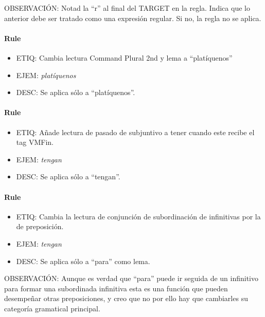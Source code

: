\documentclass[11pt]{report}
\begin{document}
OBSERVACIÓN: Notad la ``r'' al final del TARGET en la regla. Indica que lo anterior debe ser tratado como una expresión regular. Si no, la regla no se aplica.

\paragraph*{Rule}
\begin{itemize}
\item ETIQ: Cambia lectura Command Plural 2nd y lema a ``platíquenos'' 
\item EJEM: \emph{platíquenos} 
\item DESC: Se aplica sólo a ``platíquenos''.
\end{itemize}

\paragraph*{Rule}
\begin{itemize}
\item ETIQ: Añade lectura de pasado de subjuntivo a tener cuando este recibe el tag VMFin. 
\item EJEM: \emph{tengan} 
\item DESC: Se aplica sólo a ``tengan''.
\end{itemize}

\paragraph*{Rule}
\begin{itemize}
\item ETIQ: Cambia la lectura de conjunción de subordinación de infinitivas por la de preposición. 
\item EJEM: \emph{tengan} 
\item DESC: Se aplica sólo a ``para'' como lema.
\end{itemize}

OBSERVACIÓN: Aunque es verdad que ``para'' puede ir seguida de un infinitivo para formar una subordinada infinitiva esta es una función que pueden desempeñar otras preposiciones, y creo que no por ello hay que cambiarles su categoría gramatical principal.
\end{document}
